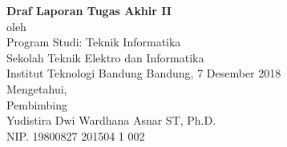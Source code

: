 \begin{center}
	\large
	\textbf{\thetitle}
	\small
\end{center}

\begin{center}
	
	\vfill
	\textbf{Draf Laporan Tugas Akhir II}\\
	\vfill
	oleh\\
	\theauthor
	\vfill
	Program Studi: Teknik Informatika \\
	Sekolah Teknik Elektro dan Informatika \\
	Institut Teknologi Bandung
	\vfill
	Bandung, 7 Desember 2018 \\
	Mengetahui,\\
	Pembimbing \\
	\vspace{60pt}
	Yudistira Dwi Wardhana Asnar ST, Ph.D.\\
	NIP. 19800827 201504 1 002
\end{center}